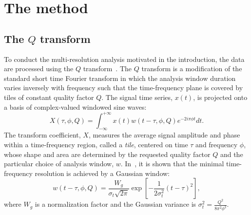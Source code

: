 \section{The method} \label{sec:method}

\subsection{The $Q$ transform} \label{sec:method:qtransform}
To conduct the multi-resolution analysis motivated in the introduction, the data are processed using the $Q$ transform~\cite{Brown:1991}. The $Q$ transform is a modification of the standard short time Fourier transform in which the analysis window duration varies inversely with frequency such that the time-frequency plane is covered by tiles of constant quality factor $Q$. The signal time series, $x(t)$, is projected onto a basis of complex-valued windowed sine waves:
\begin{equation}
  X(\tau, \phi, Q) = \int_{-\infty}^{+\infty}{ x(t) w(t-\tau,\phi,Q) e^{-2i\pi\phi t}dt}.
  \label{eq:qtransform1}
\end{equation}
The transform coefficient, $X$, measures the average signal amplitude and phase within a time-frequency region, called a \textit{tile}, centered on time $\tau$ and frequency $\phi$, whose shape and area are determined by the requested quality factor $Q$ and the particular choice of analysis window, $w$. In~\cite{Gabor:1946}, it is shown that the minimal time-frequency resolution is achieved by a Gaussian window:
\begin{equation}
  w(t-\tau,\phi,Q) = \frac{W_g}{\sigma_t\sqrt{2\pi}}\exp\left [ -\frac{1}{2\sigma_t^2}(t-\tau)^2 \right],
  \label{eq:gausswindowt}
\end{equation}
where $W_g$ is a normalization factor and the Gaussian variance is $\sigma_t^2=\frac{Q^2}{8\pi^2\phi^2}$.

